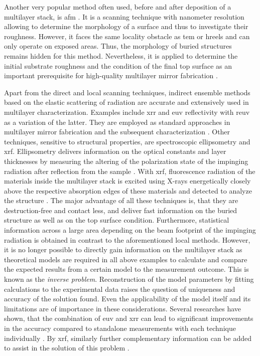 Another very popular method often used, before and after deposition of a multilayer stack, is \gls{afm} \cite{binnig_atomic_1986}. It is a scanning technique with nanometer resolution allowing to determine the morphology of a surface and thus to investigate their roughness. However, it faces the same locality obstacle as \gls{tem} or \gls{hreels} and can only operate on exposed areas. Thus, the morphology of buried structures remains hidden for this method. Nevertheless, it is applied to determine the initial substrate roughness and the condition of the final top surface as an important prerequisite for high-quality multilayer mirror fabrication \cite{louis_progress_2000, bajt_investigation_2001}.

Apart from the direct and local scanning techniques, indirect ensemble methods based on the elastic scattering of radiation are accurate and extensively used in multilayer characterization. Examples include \gls{xrr} and \gls{euv} reflectivity with \gls{reuv} as a variation of the latter. They are employed as standard approaches in multilayer mirror fabrication and the subsequent characterization \cite{lim_fabrication_2001, bajt_investigation_2001, braun_mo/si_2002}. Other techniques, sensitive to structural properties, are spectroscopic ellipsometry and \Gls{xrf}. Ellipsometry delivers information on the optical constants and layer thicknesses by measuring the altering of the polarization state of the impinging radiation after reflection from the sample \cite{arwin_unambiguous_1984, liu_thickness_1999}. With \gls{xrf}, fluorescence radiation of the materials inside the multilayer stack is excited using X-rays energetically closely above the respective absorption edges of these materials and detected to analyze the structure \cite{kortright_standing_1987, kawamura_interface_1994}. The major advantage of all these techniques is, that they are destruction-free and contact less, and deliver fast information on the buried structure as well as on the top surface condition. Furthermore, statistical information across a large area depending on the beam footprint of the impinging radiation is obtained in contrast to the aforementioned local methods. However, it is no longer possible to directly gain information on the multilayer stack as theoretical models are required in all above examples to calculate and compare the expected results from a certain model to the measurement outcome. This is known as the \emph{inverse problem}. Reconstruction of the model parameters by fitting calculations to the experimental data raises the question of uniqueness and accuracy of the solution found. Even the applicability of the model itself and its limitations are of importance in these considerations. Several researches have shown, that the combination of \gls{euv} and \gls{xrr} can lead to significant improvements in the accuracy compared to standalone measurements with each technique individually \cite{yakunin_combined_2014}. By \Gls{xrf}, similarly further complementary information can be added to assist in the solution of this problem \cite{ghose_x-ray_2001}.

